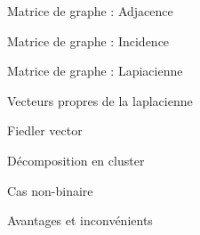 \begin{frame}{Matrice de graphe : Adjacence}
    \begin{minipage}{0.49\linewidth}
        
    \end{minipage}
    \begin{minipage}{0.49\linewidth}
    \end{minipage}
\end{frame}

\begin{frame}{Matrice de graphe : Incidence}
    \begin{minipage}{0.49\linewidth}
        
    \end{minipage}
    \begin{minipage}{0.49\linewidth}
    \end{minipage}
\end{frame}

\begin{frame}{Matrice de graphe : Lapiacienne}
    \begin{minipage}{0.49\linewidth}
        
    \end{minipage}
    \begin{minipage}{0.49\linewidth}
    \end{minipage}
\end{frame}

\begin{frame}{Vecteurs propres de la laplacienne}
\end{frame}
 
\begin{frame}{Fiedler vector}
\end{frame}

\begin{frame}{Décomposition en cluster}
\end{frame}

\begin{frame}{Cas non-binaire}
\end{frame}

\begin{frame}{Avantages et inconvénients}
\end{frame}